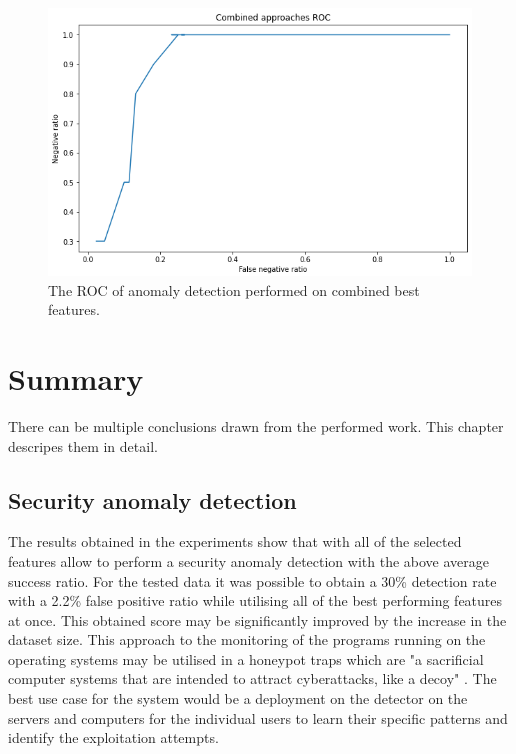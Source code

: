 \documentclass[a4paper,twoside,12pt]{book}
\begin{document}
\begin{figure}
	\centering
	\includegraphics[scale=0.9]{images/CombinedFinalROC}
	\caption{The ROC of anomaly detection performed on combined best features.}
	\label{fig:combinedFinalROC}
 \end{figure}



\chapter{Summary}

There can be multiple conclusions drawn from the performed work. This chapter descripes them in 
detail.

\section{Security anomaly detection}

The results obtained in the experiments show that with all of the selected features allow 
to perform a security anomaly detection with the above average success ratio. For the tested
data it was possible to obtain a 30\% detection rate with a 2.2\% false positive ratio while
utilising all of the best performing features at once. This obtained score may be significantly 
improved by the increase in the dataset size. This approach to the monitoring of the programs 
running on the operating systems may be utilised in a honeypot traps which are "a sacrificial 
computer systems that are intended to attract cyberattacks, like a decoy" \cite{bib:Honeypot}. 
The best use case for the system would be a deployment on the detector on the servers and 
computers for the individual users to learn their specific patterns and identify the exploitation
attempts.
\end{document}
